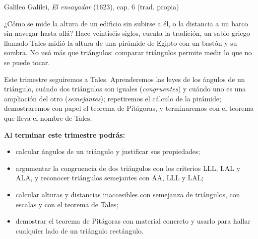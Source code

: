 \documentclass[11pt]{article}
\begin{document}
\encabezado

{Galileo Galilei, \emph{El ensayador} (1623), cap. 6 (trad. propia)~\cite{galileo}}


¿Cómo se mide la altura de un edificio sin subirse a él, o la distancia a
un barco sin navegar hasta allá? Hace veintiséis siglos, cuenta la
tradición, un sabio griego llamado Tales midió la altura de una pirámide de
Egipto con un bastón y su sombra. No usó más que triángulos: comparar
triángulos permite medir lo que no se puede tocar.

Este trimestre seguiremos a Tales. Aprenderemos las leyes de los ángulos de
un triángulo, cuándo dos triángulos son iguales (\emph{congruentes}) y
cuándo uno es una ampliación del otro (\emph{semejantes}); repetiremos el
cálculo de la pirámide; demostraremos con papel el teorema de Pitágoras, y
terminaremos con el teorema que lleva el nombre de Tales.

\textbf{Al terminar este trimestre podrás:}
\begin{itemize}
  \item calcular ángulos de un triángulo y justificar sus propiedades;
  \item argumentar la congruencia de dos triángulos con los criterios LLL,
        LAL y ALA, y reconocer triángulos semejantes con AA, LLL y LAL;
  \item calcular alturas y distancias inaccesibles con semejanza de
        triángulos, con escalas y con el teorema de Tales;
  \item demostrar el teorema de Pitágoras con material concreto y usarlo
        para hallar cualquier lado de un triángulo rectángulo.
\end{itemize}
\end{document}
